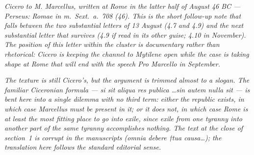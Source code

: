 
\textit{Cicero to M. Marcellus, written at Rome in the latter
half of August 46 BC --- Perseus: \textit{Romae in m.~Sext.~a.~708
(46)}. This is the short follow-up note that falls between the
two substantial letters of 13 August (4.7 and 4.9) and the next
substantial letter that survives (4.9 if read in its other
guise; 4.10 in November). The position of this letter within
the cluster is documentary rather than rhetorical: Cicero is
keeping the channel to Mytilene open while the case is taking
shape at Rome that will end with the speech \textit{Pro Marcello}
in September.}

\textit{The texture is still Cicero's, but the argument is
trimmed almost to a slogan. The familiar Ciceronian formula ---
\textit{si sit aliqua res publica \dots sin autem nulla sit} ---
is bent here into a single dilemma with no third term: either
the republic exists, in which case Marcellus must be present
in it; or it does not, in which case Rome is at least the most
fitting place to go into exile, since exile from one tyranny
into another part of the same tyranny accomplishes nothing.
The text at the close of section~1 is corrupt in the manuscripts
(\textit{omnia debere †tua causa\dots}); the translation here
follows the standard editorial sense.}
